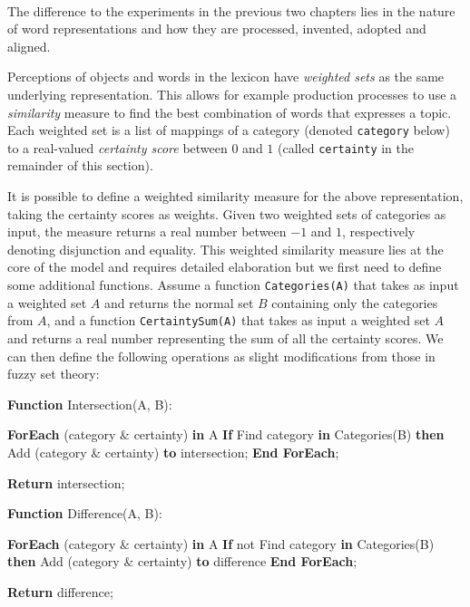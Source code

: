 ~\\

The difference to the experiments in the previous two chapters lies in
the nature of word representations and how they are processed,
invented, adopted and aligned.


 Perceptions of objects and words in the
lexicon have \emph{weighted sets} as the same underlying
representation. This allows for example production processes to use a
\emph{similarity} measure to find the best combination of words that
expresses a topic. Each weighted set is a list of mappings of a
category (denoted \texttt{category} below) to a real-valued
\emph{certainty score} between $0$ and $1$ (called \texttt{certainty} in
the remainder of this section).

 It is possible to
define a weighted similarity measure for the above representation,
taking the certainty scores as weights. Given two weighted sets of
categories as input, the measure returns a real number between $-1$
and $1$, respectively denoting disjunction and equality. This weighted
similarity measure lies at the core of the model and requires detailed
elaboration but we first need to define some additional functions.
Assume a function \texttt{Categories(A)} that takes as input a
weighted set $A$ and returns the normal set $B$ containing only the
categories from $A$, and a function \texttt{CertaintySum(A)} that
takes as input a weighted set $A$ and returns a real number
representing the sum of all the certainty scores.  We can then define
the following operations as slight modifications from those in fuzzy
set theory:

\begin{verbatim+}
\textbf{Function} Intersection(A, B):

\textbf{ForEach} (category \& certainty) \textbf{in} A
    \textbf{If} Find category \textbf{in} Categories(B)
    \textbf{then} Add (category \& certainty) \textbf{to} intersection;
\textbf{End ForEach};

\textbf{Return} intersection;
\end{verbatim+}


\begin{verbatim+}
\textbf{Function} Difference(A, B):

\textbf{ForEach} (category \& certainty) \textbf{in} A
    \textbf{If} not Find category \textbf{in} Categories(B)
    \textbf{then} Add (category \& certainty) \textbf{to} difference
\textbf{End ForEach};

\textbf{Return} difference;
\end{verbatim+}


